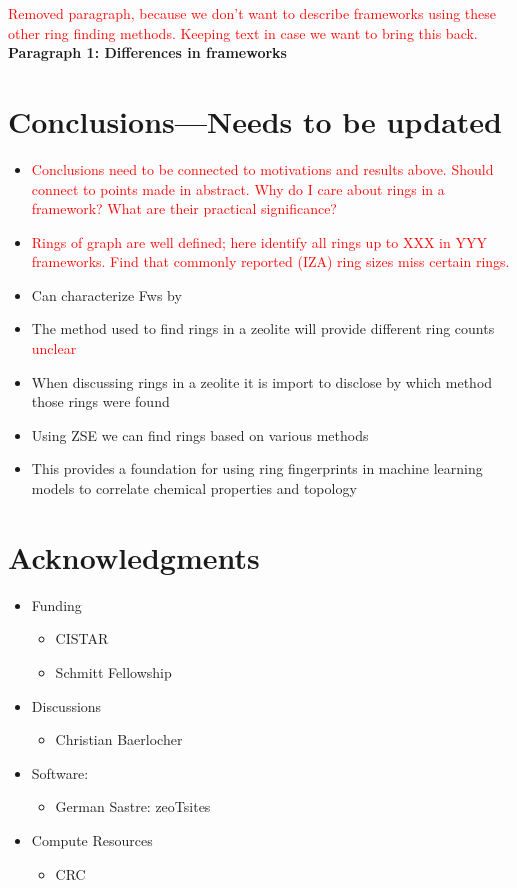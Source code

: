 \documentclass[11pt]{article}
\newcommand{\red}[1]{\textcolor{red}{#1}}
\begin{document}
\newpage
\red{Removed paragraph, because we don't want to describe frameworks using these other ring finding methods. Keeping text in case we want to bring this back.}
\textbf{\textbf{Paragraph 1: Differences in frameworks}}


\section{Conclusions---Needs to be updated}
\label{sec:org999ea72}
\begin{itemize}
\item \red{Conclusions need to be connected to motivations and results above. Should connect to points made in abstract. Why do I care about rings in a framework? What are their practical significance?}

\item \red{Rings of graph are well defined; here identify all rings up to XXX in YYY frameworks. Find that commonly reported (IZA) ring sizes miss certain rings.}

\item Can characterize Fws by
\end{itemize}


\begin{itemize}
\item The method used to find rings in a zeolite will provide different ring counts \red{unclear}
\item When discussing rings in a zeolite it is import to disclose by which method those rings were found
\item Using ZSE we can find rings based on various methods
\item This provides a foundation for using ring fingerprints in machine learning models to correlate chemical properties and topology
\end{itemize}





\section{Acknowledgments}
\label{sec:org8d20140}
\begin{itemize}
\item Funding
\begin{itemize}
\item CISTAR
\item Schmitt Fellowship
\end{itemize}
\item Discussions
\begin{itemize}
\item Christian Baerlocher
\end{itemize}
\item Software:
\begin{itemize}
\item German Sastre: zeoTsites
\end{itemize}
\item Compute Resources
\begin{itemize}
\item CRC
\end{itemize}
\end{itemize}
\end{document}
